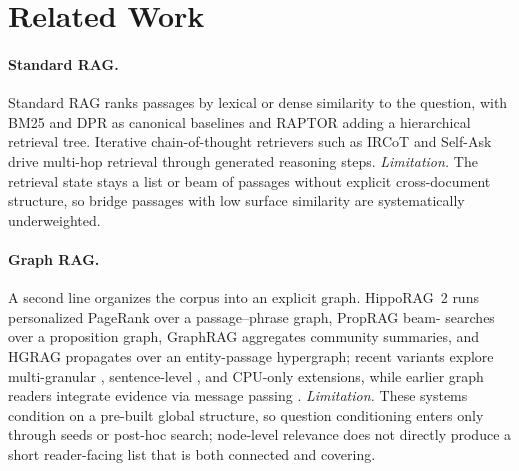%
%

\section{Related Work}
\label{sec:related}

\paragraph{Standard RAG.}
Standard RAG ranks passages by lexical or dense similarity to the
question, with BM25 \citep{robertson2009bm25} and
DPR \citep{karpukhin2020dpr} as canonical baselines and
RAPTOR \citep{sarthi2024raptor} adding a hierarchical retrieval
tree. Iterative chain-of-thought retrievers such as
IRCoT \citep{trivedi2023ircot} and Self-Ask
\citep{press2023selfask} drive multi-hop retrieval through generated
reasoning steps. \emph{Limitation.} The retrieval state stays a
list or beam of passages without explicit cross-document structure,
so bridge passages with low surface similarity are systematically
underweighted.

\paragraph{Graph RAG.}
A second line organizes the corpus into an explicit graph.
HippoRAG~2 \citep{gutierrez2025hipporag} runs personalized PageRank
over a passage--phrase graph, PropRAG \citep{wang2025proprag} beam-
searches over a proposition graph, GraphRAG
\citep{edge2024graphrag} aggregates community summaries, and
HGRAG \citep{hgrag2024} propagates over an entity-passage hypergraph;
recent variants explore multi-granular
\citep{hu2026mgrangrag}, sentence-level \citep{liang2026sentgraph},
and CPU-only \citep{wang2026sprig} extensions, while earlier graph
readers integrate evidence via message
passing \citep{qiu2019dfgn,song2022evidenceintegration}.
\emph{Limitation.} These systems condition on a pre-built global
structure, so question conditioning enters only through seeds or
post-hoc search; node-level relevance does not directly produce a
short reader-facing list that is both connected and covering.

